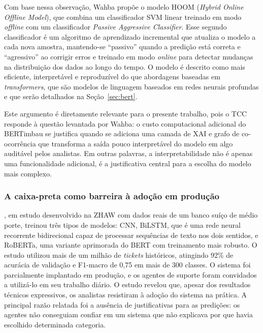 \documentclass[
    12pt,                %
    openright,           %
    oneside,             %
    a4paper,             %
    english,             %
    brazil               %
]{abntex2}
\begin{document}
Com base nessa observação, Wahba propõe o modelo HOOM 
(\textit{Hybrid Online Offline Model}), que combina um classificador SVM linear treinado em modo \textit{offline} com um classificador \textit{Passive Aggressive Classifier}. Esse segundo classificador 
é um algoritmo de aprendizado incremental que atualiza o modelo a cada nova amostra, mantendo-se ``passivo'' quando a predição está correta e ``agressivo'' ao corrigir erros e treinado em modo 
\textit{online} para detectar mudanças na distribuição dos dados ao longo do tempo. O modelo é descrito como mais eficiente, interpretável e reproduzível 
do que abordagens baseadas em \textit{transformers}, que são modelos 
de linguagem baseados em redes neurais profundas e que serão 
detalhados na Seção~\ref{sec:bert}.

Este argumento é diretamente relevante para o presente trabalho, pois o TCC responde à questão levantada por Wahba: o custo computacional adicional do BERTimbau se justifica quando se adiciona uma camada de XAI e grafo de co-ocorrência que transforma a saída pouco interpretável do modelo em algo auditável pelos analistas. Em outras palavras, a interpretabilidade não é apenas uma funcionalidade adicional, é a justificativa central para a escolha do modelo mais complexo.

\subsubsection{A caixa-preta como barreira à adoção em produção}
\label{subsubsec:helpdesk_caixapreta}

, em estudo desenvolvido na ZHAW com dados reais 
de um banco suíço de médio porte, treinou três tipos de modelos: CNN, 
BiLSTM, que é uma rede neural recorrente bidirecional capaz de 
processar sequências de texto nos dois sentidos, e RoBERTa, uma 
variante aprimorada do BERT com treinamento mais robusto. O estudo 
utilizou mais de um milhão de \textit{tickets} históricos, atingindo 
92\% de acurácia de validação e F1-macro de 0,75 em mais de 300 
classes. O sistema foi parcialmente implantado em produção, e os agentes de suporte foram 
convidados a utilizá-lo em seu trabalho diário. O estudo revelou que, 
apesar dos resultados técnicos expressivos, os analistas resistiram 
à adoção do sistema na prática. A principal razão relatada foi a 
ausência de justificativas para as predições: os agentes não 
conseguiam confiar em um sistema que não explicava por que havia 
escolhido determinada categoria.
\end{document}
